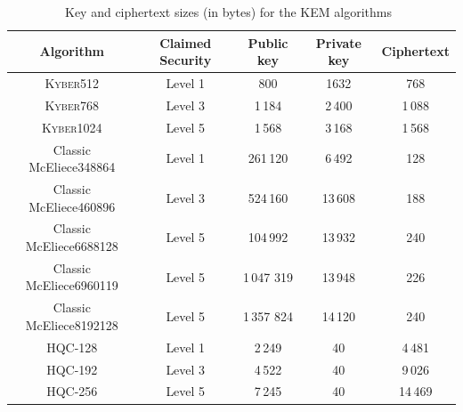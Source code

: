 \begin{table}[h]
    \centering
    \begin{tabular}[p]{| c | c | c | c | c |}
        \hline
        \textbf{Algorithm} & \textbf{Claimed Security} & \textbf{Public key} & \textbf{Private key} & \textbf{Ciphertext} \\ \hline
        \textsc{Kyber512} & Level 1 & 800 & 1632 & 768 \\
        \textsc{Kyber768} & Level 3 & 1\,184 & 2\,400 & 1\,088 \\
        \textsc{Kyber1024} & Level 5 & 1\,568 & 3\,168 & 1\,568 \\
        \hline
        Classic McEliece348864 & Level 1 &  261\,120 & 6\,492 & 128 \\
        Classic McEliece460896 & Level 3 & 524\,160 & 13\,608 & 188 \\
        Classic McEliece6688128 & Level 5 & 104\,992 & 13\,932 & 240 \\
        Classic McEliece6960119 & Level 5 & 1\,047 319 & 13\,948 & 226 \\
        Classic McEliece8192128 & Level 5 & 1\,357 824 & 14\,120 & 240 \\
        \hline
        HQC-128 & Level 1 & 2\,249 & 40 & 4\,481 \\
        HQC-192 & Level 3 & 4\,522 & 40 & 9\,026 \\
        HQC-256 & Level 5 & 7\,245 & 40 & 14\,469 \\
        \hline
    \end{tabular}
    \caption{Key and ciphertext sizes (in bytes) for the KEM algorithms~\cite{NIST.round3.report}}
    \label{tab:asym.enc.sizes}
\end{table}


